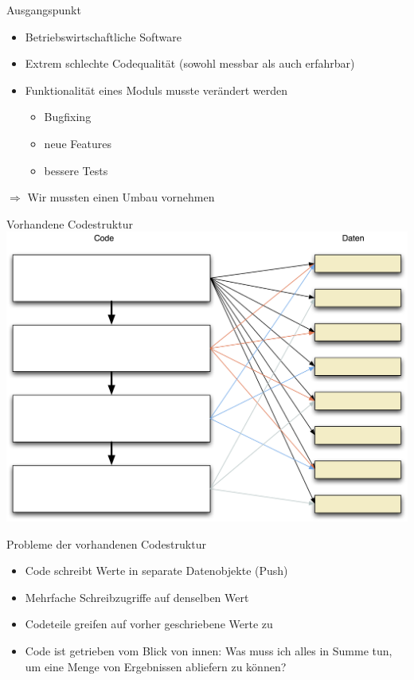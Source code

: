 \begin{frame}[t,fragile]{Ausgangspunkt}
\begin{itemize}
\item Betriebswirtschaftliche Software
\item Extrem schlechte Codequalität (sowohl messbar als auch erfahrbar)
\item Funktionalität eines Moduls musste verändert werden
\begin{itemize}
\item Bugfixing
\item neue Features
\item bessere Tests
\end{itemize}
\end{itemize}

$\Rightarrow$ Wir mussten einen Umbau vornehmen
\end{frame}

\begin{frame}[t,fragile]{Vorhandene Codestruktur}
\includegraphics[width=.8 \paperwidth]{Codestruktur.png}
\end{frame}

\begin{frame}[t,fragile]{Probleme der vorhandenen Codestruktur}
\begin{itemize}
\item Code schreibt Werte in separate Datenobjekte (\glqq Push\grqq{})
\item Mehrfache Schreibzugriffe auf denselben Wert
\item Codeteile greifen auf vorher geschriebene Werte zu
\item Code ist getrieben vom Blick von innen: Was muss ich alles in Summe tun, um eine Menge von Ergebnissen abliefern zu können?
\end{itemize}
\end{frame}



